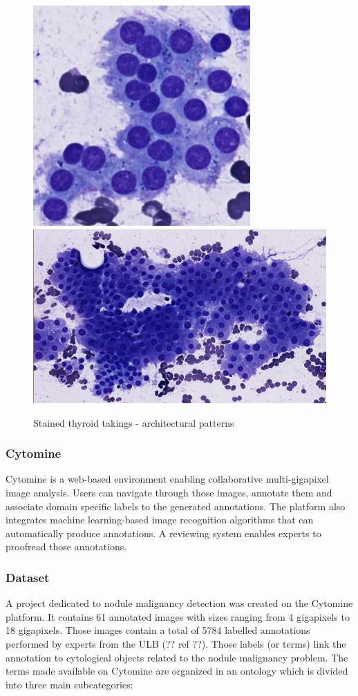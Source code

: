 \begin{figure}
{		\includegraphics[scale=0.5]{image/normal_pattern_1.png}
		\includegraphics[scale=0.5]{image/normal_pattern_2.png}
		\label{sfig:norm_patterns}
	}
	\caption{Stained thyroid takings - architectural patterns}
	\label{fig:intro_pattern_ex}
\end{figure}

\subsubsection{Cytomine} 
Cytomine \cite{maree2016collaborative} is a web-based environment enabling collaborative multi-gigapixel image analysis. Users can navigate through those images, annotate them and associate domain specific labels to the generated annotations. The platform also integrates machine learning-based image recognition algorithms that can automatically produce annotations. A reviewing system enables experts to proofread those annotations. 

\subsubsection{Dataset}
\label{sssec:detection_thyroid_dataset}
A project dedicated to nodule malignancy detection was created on the Cytomine platform. It contains 61 annotated images with sizes ranging from 4 gigapixels to 18 gigapixels. Those images contain a total of 5784 labelled annotations performed by experts from the ULB (?? ref ??). Those labels (or terms) link the annotation to cytological objects related to the nodule malignancy problem. The terms made available on Cytomine are organized in an ontology which is divided into three main subcategories:

